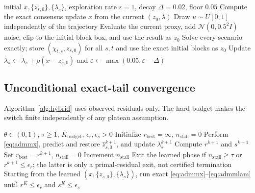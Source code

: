 \documentclass[preprint,12pt,3p]{elsarticle}
\theoremstyle{definition}
\begin{document}
\begin{algorithm}[htbp]
\caption{$\varepsilon$-greedy exact-label generation}
\label{alg:datagen}
\begin{algorithmic}[1]
\Require initial $x,\{z_{s,0}\},\{\lambda_s\}$, exploration rate $\varepsilon=1$, decay $\Delta=0.02$, floor $0.05$
\State Compute the exact consensus update $x$ from the current $(z_0,\lambda)$
\State Draw $u\sim U[0,1]$ independently of the trajectory
\State Evaluate the current proxy, add $\mathcal N(0,0.5^2I)$ noise, clip to the initial-block box, and use the result as $z_0$
\Else
\State Solve every scenario exactly; store $(\chi_{t,s},z_{s,0})$ for all $s,t$ and use the exact initial blocks as $z_0$
\EndIf
\State Update $\lambda_s\leftarrow\lambda_s+\rho(x-z_{s,0})$ and $\varepsilon\leftarrow\max(0.05,\varepsilon-\Delta)$
\EndFor
\end{algorithmic}
\end{algorithm}

\subsection{Unconditional exact-tail convergence}
Algorithm~\ref{alg:hybrid} uses observed residuals only. The hard budget makes the switch finite independently of any plateau assumption.

\begin{algorithm}[htbp]
\caption{Initial-block learned warm start with exact tail}
\label{alg:hybrid}
\begin{algorithmic}[1]
\Require $\theta\in(0,1)$, $\tau\geq1$, $K_{\mathrm{budget}}$, $\epsilon_r,\epsilon_s>0$
\State Initialize $r_{\mathrm{best}}=\infty$, $n_{\mathrm{stall}}=0$
\State Perform \eqref{eq:admmx}, predict and restore $\widehat z_{s,0}^{k+1}$, and update $\lambda_s^{k+1}$
\State Compute $r^{k+1}$ and $s^{k+1}$
\State Set $r_{\mathrm{best}}=r^{k+1}$, $n_{\mathrm{stall}}=0$
\Else
\State Increment $n_{\mathrm{stall}}$
\EndIf
\State Exit the learned phase if $n_{\mathrm{stall}}\geq\tau$ or $r^{k+1}\leq\epsilon_r$; the latter is only a primal-residual exit, not certified termination
\EndFor
\State Starting from the learned $(x,\{z_{s,0}\},\{\lambda_s\})$, run exact \eqref{eq:admmx}--\eqref{eq:admmlam} until $r^K\leq\epsilon_r$ and $s^K\leq\epsilon_s$
\end{algorithmic}
\end{algorithm}
\end{document}

